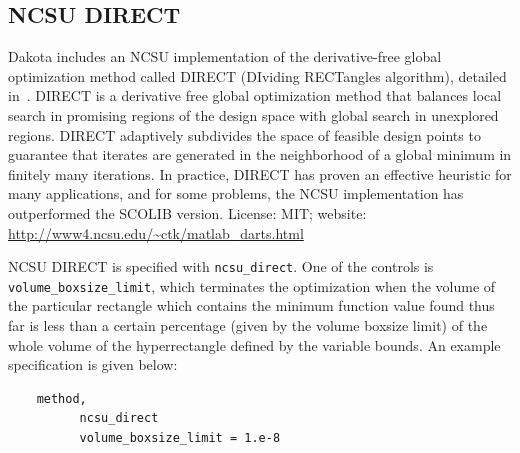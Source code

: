 


\subsection{NCSU DIRECT}\label{opt:software:ncsu}

Dakota includes an NCSU implementation of the derivative-free global
optimization method called DIRECT (DIviding RECTangles algorithm),
detailed in~\cite{Gab01}. DIRECT is a derivative free global
optimization method that balances local search in promising regions of
the design space with global search in unexplored regions. DIRECT
adaptively subdivides the space of feasible design points to guarantee
that iterates are generated in the neighborhood of a global minimum in
finitely many iterations. In practice, DIRECT has proven an effective
heuristic for many applications, and for some problems, the NCSU
implementation has outperformed the SCOLIB version. License: MIT;
website: \url{http://www4.ncsu.edu/~ctk/matlab_darts.html}

NCSU DIRECT is specified with \texttt{ncsu\_direct}. One of the
controls is \texttt{volume\_boxsize\_limit}, which terminates the
optimization when the volume of the particular rectangle which contains
the minimum function value found thus far
is less than a certain percentage (given by the volume boxsize limit) of
the whole volume of the hyperrectangle defined by the variable bounds.
An example specification is given below:
\begin{small}
\begin{verbatim}
    method,
          ncsu_direct
          volume_boxsize_limit = 1.e-8
\end{verbatim}
\end{small}

